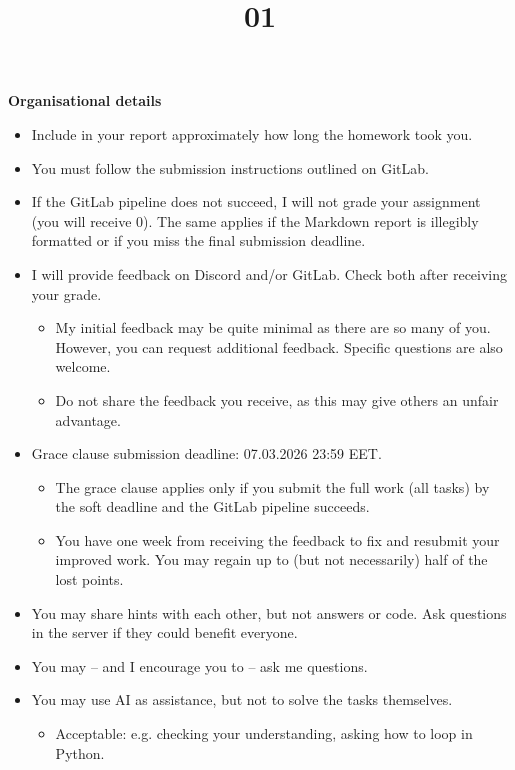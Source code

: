 \documentclass{homework}
\title{01}
\begin{document}
\maketitle

\textbf{Organisational details}

\begin{itemize}
  \item Include in your report approximately how long the homework took you.
  \item You must follow the submission instructions outlined on GitLab.
  \item If the GitLab pipeline does not succeed, I will not grade your assignment (you will receive 0).
  The same applies if the Markdown report is illegibly formatted or if you miss the final submission deadline.
  \item I will provide feedback on Discord and/or GitLab.
  Check both after receiving your grade.
  \begin{itemize}
    \item My initial feedback may be quite minimal as there are so many of you.
    However, you can request additional feedback.
    Specific questions are also welcome.
    \item Do not share the feedback you receive, as this may give others an unfair advantage.
  \end{itemize}
  \item Grace clause submission deadline: 07.03.2026 23:59 EET.
  \begin{itemize}
    \item The grace clause applies only if you submit the full work (all tasks) by the soft deadline and the GitLab pipeline succeeds.
    \item You have one week from receiving the feedback to fix and resubmit your improved work.
    You may regain up to (but not necessarily) half of the lost points.
  \end{itemize}
  \item You may share hints with each other, but not answers or code.
  Ask questions in the server if they could benefit everyone.
  \item You may -- and I encourage you to -- ask me questions.
  \item You may use AI as assistance, but not to solve the tasks themselves.
  \begin{itemize}
    \item Acceptable: e.g. checking your understanding, asking how to loop in Python.

\end{itemize}
\end{itemize}
\end{document}
